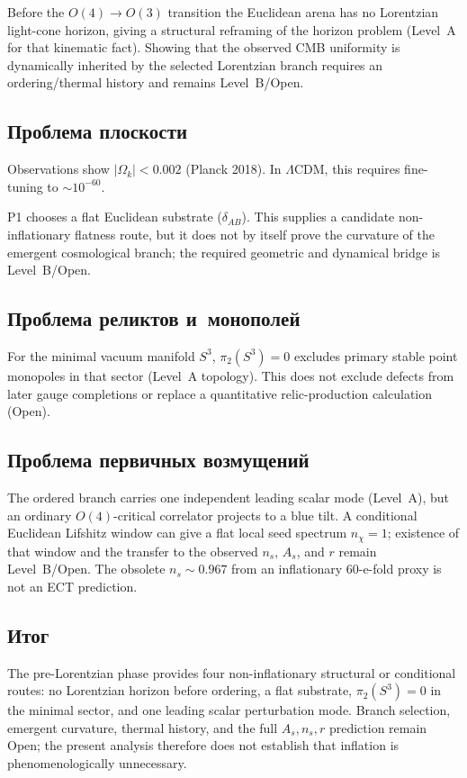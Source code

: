 \documentclass[11pt,a4paper]{article}
\begin{document}
Before the $O(4) \to O(3)$ transition the Euclidean arena has no Lorentzian light-cone horizon, giving a structural reframing of the horizon problem (Level~A for that kinematic fact).  Showing that the observed CMB uniformity is dynamically inherited by the selected Lorentzian branch requires an ordering/thermal history and remains Level~B/Open.

\subsection{Проблема плоскости}

Observations show $|\Omega_k| < 0.002$ (Planck 2018). In $\Lambda$CDM, this requires fine-tuning to $\sim 10^{-60}$.

P1 chooses a flat Euclidean substrate ($\delta_{AB}$).  This supplies a candidate non-inflationary flatness route, but it does not by itself prove the curvature of the emergent cosmological branch; the required geometric and dynamical bridge is Level~B/Open.

\subsection{Проблема реликтов и~монополей}

For the minimal vacuum manifold $S^3$, $\pi_2(S^3)=0$ excludes primary stable point monopoles in that sector (Level~A topology). This does not exclude defects from later gauge completions or replace a quantitative relic-production calculation (Open).

\subsection{Проблема первичных возмущений}

The ordered branch carries one independent leading scalar mode (Level~A), but an ordinary $O(4)$-critical correlator projects to a blue tilt.  A conditional Euclidean Lifshitz window can give a flat local seed spectrum $n_\chi=1$; existence of that window and the transfer to the observed $n_s$, $A_s$, and $r$ remain Level~B/Open. The obsolete $n_s\sim0.967$ from an inflationary 60-e-fold proxy is not an ECT prediction.

\subsection{Итог}

The pre-Lorentzian phase provides four non-inflationary structural or conditional routes: no Lorentzian horizon before ordering, a flat substrate, $\pi_2(S^3)=0$ in the minimal sector, and one leading scalar perturbation mode.  Branch selection, emergent curvature, thermal history, and the full $A_s,n_s,r$ prediction remain Open; the present analysis therefore does not establish that inflation is phenomenologically unnecessary.
\end{document}
